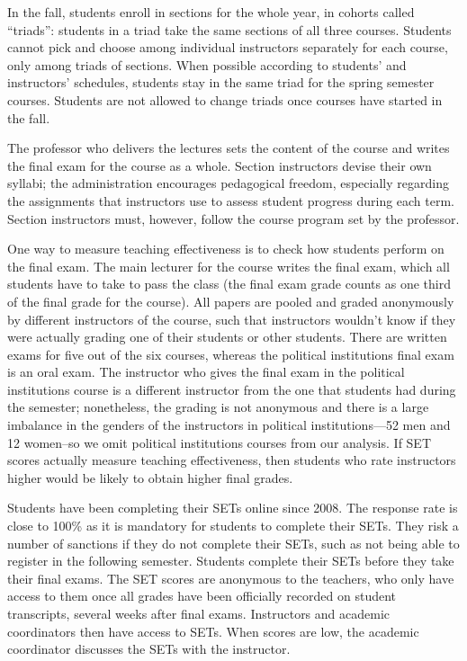 \documentclass[12pt]{article}
\begin{document}
In the fall, students enroll in sections for the whole year, in cohorts called ``triads'':
students in a triad take the same sections of all three courses.
Students cannot pick and choose among individual instructors separately for
each course, only among triads of sections.
When possible according to students' and instructors' schedules, 
students stay in the same triad for the spring semester courses. 
Students are not allowed to change triads once courses have started in the fall. 

The professor who delivers the lectures sets the content of the course and 
writes the final exam for the course as a whole. 
Section instructors devise their own syllabi;
the administration encourages pedagogical freedom, especially regarding 
the assignments that instructors use to assess student progress during each term. 
Section instructors must, however, follow the course program set by the professor. 

One way to measure teaching effectiveness is to check how students perform on the final exam. 
The main lecturer for the course writes the final exam, which all students have to take to pass the class 
(the final exam grade counts as one third of the final grade for the course). 
All papers are pooled and graded anonymously by different instructors of the course, such that instructors wouldn't know 
if they were actually grading one of their students or other students. 
There are written exams for five out of the six 
courses, whereas the political institutions final exam is an oral exam. 
The instructor who gives the final exam in the 
political institutions course is a different instructor from the one that students had during the semester;
nonetheless, the grading is not anonymous and there is a large imbalance in the genders of the
instructors in political institutions---52 men and 12 women--so we omit political institutions courses
from our analysis.
If SET scores actually measure teaching effectiveness, then students who rate instructors 
higher would be likely to obtain higher final grades. 

Students have been completing their SETs online since 2008. 
The response rate is close to 100\% as it is mandatory for 
students to complete their SETs. 
They risk a number of sanctions if they do not complete their SETs, such as not being able 
to register in the following semester. Students complete their SETs 
before they take their final exams. The SET scores are
anonymous to the teachers, who only have access to them once all grades have been officially recorded on student transcripts, 
several weeks after final exams. Instructors and academic coordinators then have access to SETs. When scores are low, the 
academic coordinator discusses the SETs with the instructor.   
\end{document}
